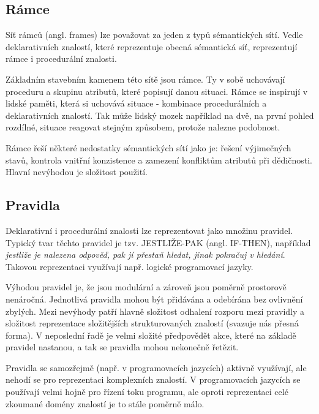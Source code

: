 \subsection{Rámce}
Síť rámců (angl. frames) lze považovat za jeden z typů sémantických sítí. Vedle deklarativních znalostí, které reprezentuje obecná sémantická síť, reprezentují rámce i procedurální znalosti.\par
Základním stavebním kamenem této sítě jsou rámce. Ty v sobě uchovávají proceduru a skupinu atributů, které popisují danou situaci. Rámce se inspirují v lidské paměti, která si uchovává situace - kombinace procedurálních a deklarativních znalostí. Tak může lidský mozek například na dvě, na první pohled rozdílné, situace reagovat stejným způsobem, protože nalezne podobnost.\cite{cite:11}\par
Rámce řeší některé nedostatky sémantických sítí jako je: řešení výjimečných stavů, kontrola vnitřní konzistence a zamezení konfliktům atributů při dědičnosti. Hlavní nevýhodou je složitost použití.\cite{cite:12}
\subsection{Pravidla}
Deklarativní i procedurální znalosti lze reprezentovat jako množinu pravidel. Typický tvar těchto pravidel je tzv. JESTLIŽE-PAK (angl. IF-THEN), například \textit{jestliže je nalezena odpověď, pak jí přestaň hledat, jinak pokračuj v hledání}\cite{cite:11}. Takovou reprezentaci využívají např. logické programovací jazyky.\cite{cite:12}\par
Výhodou pravidel je, že jsou modulární a zároveň jsou poměrně prostorově nenáročná. Jednotlivá pravidla mohou být přidávána a odebírána bez ovlivnění zbylých. Mezi nevýhody patří hlavně složitost odhalení rozporu mezi pravidly a složitost reprezentace složitějších strukturovaných znalostí (svazuje nás přesná forma). V neposlední řadě je velmi složité předpovědět akce, které na základě pravidel nastanou, a tak se pravidla mohou nekonečně řetězit.\cite{cite:12}\par
Pravidla se samozřejmě (např. v programovacích jazycích) aktivně využívají, ale nehodí se pro reprezentaci komplexních znalostí. V programovacích jazycích se používají velmi hojně pro řízení toku programu, ale oproti reprezentaci celé zkoumané domény znalostí je to stále poměrně málo.
